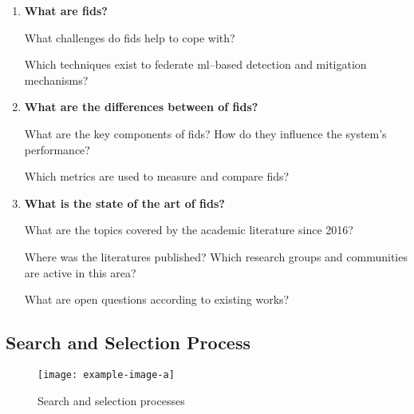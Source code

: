 \begin{enumerate}[label=\textbf{\arabic*)}]
    \item \textbf{What are \gls{fids}?}
        \begin{RQ}{1.1} \label{rq:challenges}
            What challenges do \gls{fids} help to cope with?
        \end{RQ}
        \begin{RQ}{1.2} \label{rq:techniques}
            Which techniques exist to federate \gls{ml}--based detection and
            mitigation mechanisms?
        \end{RQ}

    \item \textbf{What are the differences between of \gls{fids}?}
        \begin{RQ}{2.1} \label{rq:components}
            What are the key components of \gls{fids}? How do they influence
            the system's performance?
        \end{RQ}
        \begin{RQ}{2.2} \label{rq:metrics}
            Which metrics are used to measure and compare \gls{fids}?
        \end{RQ}
    
    \item \textbf{What is the state of the art of \gls{fids}?}
        \begin{RQ}{3.1} \label{rq:literature}
            What are the topics covered by the academic literature since 2016?
        \end{RQ}
        \begin{RQ}{3.2} \label{rq:wherewho}
            Where was the literatures published? Which research groups and communities
            are active in this area?
        \end{RQ}
        \begin{RQ}{3.3} \label{rq:open}
            What are open questions according to existing works?
        \end{RQ}
\end{enumerate}


\subsection{Search and Selection Process\label{sec:sota.methodo.search}}


\begin{figure}
  \centering
  \texttt{[image: example-image-a]}
  \caption{Search and selection processes}
  \label{fig:methodo.original}
\end{figure}

